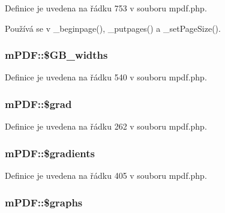 Definice je uvedena na řádku 753 v souboru mpdf.\-php.



Používá se v \-\_\-beginpage(), \-\_\-putpages() a \-\_\-set\-Page\-Size().

\hypertarget{classm_p_d_f_aab02e8172b4eda49a723661dc604a183}{
\subsubsection[{\$\-G\-B\-\_\-widths}]{\setlength{\rightskip}{0pt plus 5cm}m\-P\-D\-F\-::\$\-G\-B\-\_\-widths}}\label{classm_p_d_f_aab02e8172b4eda49a723661dc604a183}


Definice je uvedena na řádku 540 v souboru mpdf.\-php.

\hypertarget{classm_p_d_f_a6880c8c979b2fad841acbe2590a0038f}{
\subsubsection[{\$grad}]{\setlength{\rightskip}{0pt plus 5cm}m\-P\-D\-F\-::\$grad}}\label{classm_p_d_f_a6880c8c979b2fad841acbe2590a0038f}


Definice je uvedena na řádku 262 v souboru mpdf.\-php.

\hypertarget{classm_p_d_f_a84dfb59af1002e74d2339934daac21e3}{
\subsubsection[{\$gradients}]{\setlength{\rightskip}{0pt plus 5cm}m\-P\-D\-F\-::\$gradients}}\label{classm_p_d_f_a84dfb59af1002e74d2339934daac21e3}


Definice je uvedena na řádku 405 v souboru mpdf.\-php.

\hypertarget{classm_p_d_f_a17bf0c0f0705d52108cb9a380109aae4}{
\subsubsection[{\$graphs}]{\setlength{\rightskip}{0pt plus 5cm}m\-P\-D\-F\-::\$graphs}}\label{classm_p_d_f_a17bf0c0f0705d52108cb9a380109aae4}


